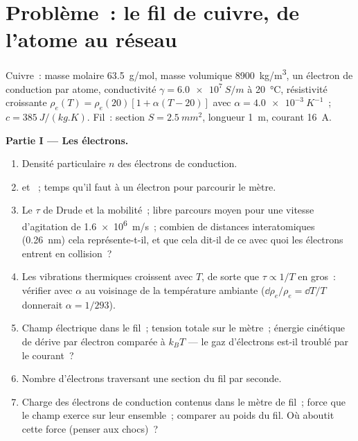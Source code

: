 \section{Problème~: le fil de cuivre, de l'atome au réseau}

\begin{problem}
\label{pb:b2:charges-currents-conduction:1}

Cuivre~: masse molaire \qty{63.5}{g/mol}, masse volumique \qty{8900}{kg/m^3}, un
électron de conduction par atome, conductivité $\gamma = \qty{6.0e7}{S/m}$ à
\qty{20}{\degreeCelsius}, résistivité croissante $\rho_e(T) = \rho_e(20)[1 +
\alpha(T - 20)]$ avec $\alpha = \qty{4.0e-3}{K^{-1}}$~; $c = \qty{385}{J/(kg.K)}$. Fil~:
section $S = \qty{2.5}{mm^2}$, longueur \qty{1}{m}, courant \qty{16}{A}.

\medskip
\noindent\textbf{Partie I --- Les électrons.}
\begin{enumerate}
  \item Densité particulaire $n$ des électrons de conduction.
  \item {} et ~; temps qu'il faut à un électron
        pour parcourir le mètre.
  \item Le $\tau$ de Drude et la mobilité~; libre parcours moyen pour une vitesse
        d'agitation de \qty{1.6e6}{m/s}~; combien de distances interatomiques (\qty{0.26}{nm})
        cela représente-t-il, et que cela dit-il de ce avec quoi les électrons
        entrent en collision~?
  \item Les vibrations thermiques croissent avec $T$, de sorte que $\tau \propto 1/T$ en gros~:
        vérifier avec $\alpha$ au voisinage de la température ambiante ($\dd\rho_e/\rho_e =
        \dd T/T$ donnerait $\alpha = 1/293$).
  \item Champ électrique dans le fil~; tension totale sur le mètre~;
        énergie cinétique de dérive par électron comparée à $k_BT$ ---
        le gaz d'électrons est-il troublé par le courant~?
  \item Nombre d'électrons traversant une section du fil par seconde.
  \item Charge des électrons de conduction contenus dans le mètre de fil~; force que
        le champ exerce sur leur ensemble~; comparer au
        poids du fil. Où aboutit cette force (penser
        aux chocs)~?
\end{enumerate}


\end{problem}
